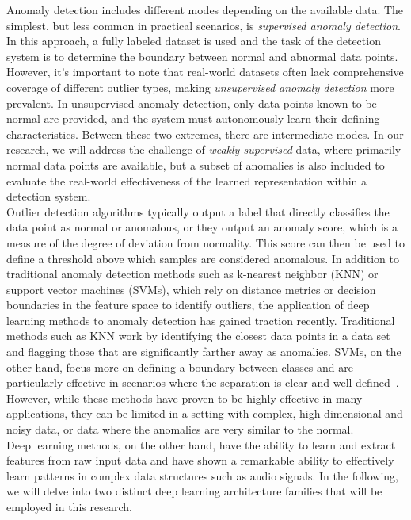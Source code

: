 Anomaly detection includes different modes depending on the available data. The simplest, but less common in practical scenarios, is \textit{supervised anomaly detection}. In this approach, a fully labeled dataset is used and the task of the detection system is to determine the boundary between normal and abnormal data points. However, it's important to note that real-world datasets often lack comprehensive coverage of different outlier types, making \textit{unsupervised anomaly detection} more prevalent. In unsupervised anomaly detection, only data points known to be normal are provided, and the system must autonomously learn their defining characteristics. Between these two extremes, there are intermediate modes. In our research, we will address the challenge of \textit{weakly supervised} data, where primarily normal data points are available, but a subset of anomalies is also included to evaluate the real-world effectiveness of the learned representation within a detection system. \\
Outlier detection algorithms typically output a label that directly classifies the data point as normal or anomalous, or they output an anomaly score, which is a measure of the degree of deviation from normality. This score can then be used to define a threshold above which samples are considered anomalous. In addition to traditional anomaly detection methods such as k-nearest neighbor (KNN) or support vector machines (SVMs), which rely on distance metrics or decision boundaries in the feature space to identify outliers, the application of deep learning methods to anomaly detection has gained traction recently. Traditional methods such as KNN work by identifying the closest data points in a data set and flagging those that are significantly farther away as anomalies. SVMs, on the other hand, focus more on defining a boundary between classes and are particularly effective in scenarios where the separation is clear and well-defined~\cite{chandola2009anomaly}. However, while these methods have proven to be highly effective in many applications, they can be limited in a setting with complex, high-dimensional and noisy data, or data where the anomalies are very similar to the normal.\\
Deep learning methods, on the other hand, have the ability to learn and extract features from raw input data and have shown a remarkable ability to effectively learn patterns in complex data structures such as audio signals. In the following, we will delve into two distinct deep learning architecture families that will be employed in this research.

